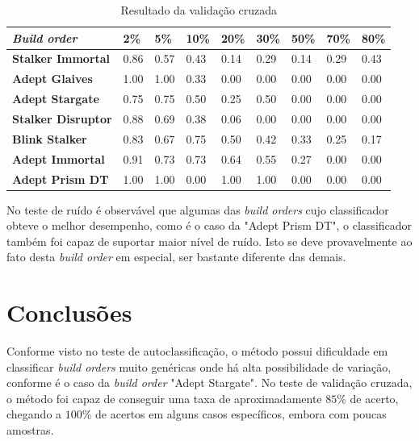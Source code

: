 \begin{table}[H]
\centering
\caption{Resultado da validação cruzada}
\label{tab:resultados-cruzada}
\begin{tabular}{l|l|l|l|l|l|l|l|l}
	\textit{Build order} 		& 2\%  & 5\%  & 10\% & 20\% & 30\% & 50\% & 70\% & 80\% \\ \hline
	\textbf{Stalker Immortal} 	& 0.86 & 0.57 & 0.43 & 0.14 & 0.29 & 0.14 & 0.29 & 0.43 \\
	\textbf{Adept Glaives} 		& 1.00 & 1.00 & 0.33 & 0.00 & 0.00 & 0.00 & 0.00 & 0.00 \\
	\textbf{Adept Stargate} 		& 0.75 & 0.75 & 0.50 & 0.25 & 0.50 & 0.00 & 0.00 & 0.00 \\
	\textbf{Stalker Disruptor} 	& 0.88 & 0.69 & 0.38 & 0.06 & 0.00 & 0.00 & 0.00 & 0.00 \\
	\textbf{Blink Stalker} 		& 0.83 & 0.67 & 0.75 & 0.50 & 0.42 & 0.33 & 0.25 & 0.17 \\
	\textbf{Adept Immortal} 		& 0.91 & 0.73 & 0.73 & 0.64 & 0.55 & 0.27 & 0.00 & 0.00 \\
	\textbf{Adept Prism DT} 		& 1.00 & 1.00 & 0.00 & 1.00 & 1.00 & 0.00 & 0.00 & 0.00 \\
\end{tabular}
\end{table}

No teste de ruído é observável que algumas das \textit{build orders} cujo classificador obteve o melhor desempenho, como é o caso da "Adept Prism DT", o classificador também foi capaz de suportar maior nível de ruído. Isto se deve provavelmente ao fato desta \textit{build order} em especial, ser bastante diferente das demais.

	\chapter{Conclusões}
Conforme visto no teste de autoclassificação, o método possui dificuldade em classificar \textit{build orders} muito genéricas onde há alta possibilidade de variação, conforme é o caso da \textit{build order} "Adept Stargate". No teste de validação cruzada, o método foi capaz de conseguir uma taxa de aproximadamente $85\%$ de acerto, chegando a $100\%$ de acertos em alguns casos específicos, embora com poucas amostras.



